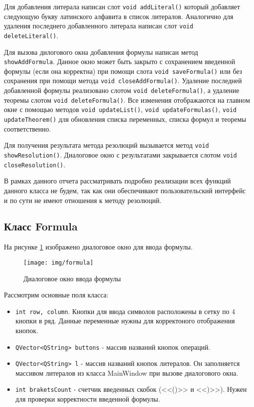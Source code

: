 \documentclass[12pt, a4paper]{article}
\begin{document}
	 \par Для добавления литерала написан слот \texttt{void addLiteral()} который добавляет следующую букву латинского алфавита в список литералов. Аналогично для удаления последнего добавленного литерала написан слот \texttt{void deleteLiteral()}.
	 \par Для вызова дилогового окна добавления формулы написан метод \texttt{showAddFormula}. Данное окно может быть закрыто с сохранением введенной формулы (если она корректна) при помощи слота \texttt{void saveFormula()} или без сохранения при помощи метода \texttt{void closeAddFormula()}. Удаление последней добавленной формулы реализовано слотом \texttt{void deleteFormula()}, а удаление теоремы слотом \texttt{void deleteFormula()}. Все изменения отображаются на главном окне с помощью методов \texttt{void updateList()}, \texttt{void updateFormulas()}, \texttt{void updateTheorem()} для обновления списка переменных, списка формул и теоремы соответственно.
	 \par Для получения результата метода резолюций вызывается метод \texttt{void\\ showResolution()}. Диалоговое окно с результатами закрывается слотом \texttt{void\\ closeResolution()}. 
	 \par В рамках данного отчета рассматривать подробно реализации всех функций данного класса не будем, так как они обеспечивают пользовательский интерфейс и по сути не имеют отношения к методу резолюций. 
	 \newpage
	  \begin{center}
	 	\subsection{Класс Formula}
	 \end{center} 
	 \par На рисунке \ref{fig:formula} изображено диалоговое окно для ввода формулы.
	 \begin{figure}[h!]
	 	\centering
	 	\texttt{[image: img/formula]}
	 	\caption{Диалоговое окно ввода формулы}
	 	\label{fig:formula}
	 \end{figure}
	 Рассмотрим основные поля класса:
	 \begin{itemize}
	 	\item \texttt{int row, column}. Кнопки для ввода символов расположены в сетку по 4 кнопки в ряд. Данные переменные нужны для корректоного отображения кнопок.
	 	\item \texttt{QVector<QString> buttons} - массив названий кнопок операций.
	 	\item \texttt{QVector<QString> l} - массив названий кнопок литералов. Он заполняется массивом литералов из класса MainWindow при вызове диалогового окна.
	 	\item \texttt{int braketsCount} - счетчик введенных скобок (<<()>> и <<)>>). Нужен для проверки корректности введенной формулы.
	 \end{itemize}
\end{document}
